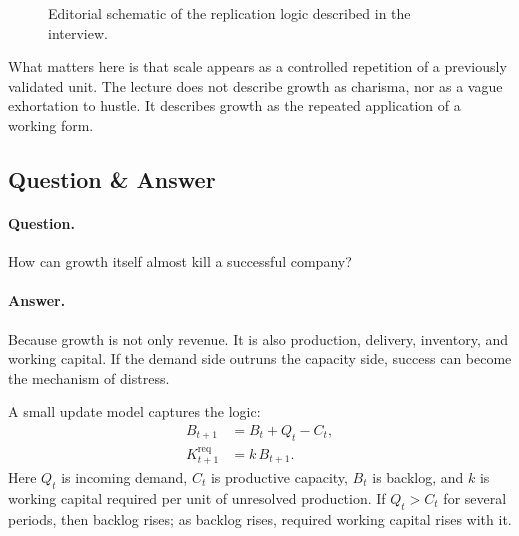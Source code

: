 \begin{figure}[h]
\centering
{}
\caption{Editorial schematic of the replication logic described in the interview.}
\end{figure}

What matters here is that scale appears as a controlled repetition of a previously validated unit. The lecture does not describe growth as charisma, nor as a vague exhortation to hustle. It describes growth as the repeated application of a working form.

\subsection{Question \& Answer}

\paragraph{Question.} How can growth itself almost kill a successful company?

\paragraph{Answer.} Because growth is not only revenue. It is also production, delivery, inventory, and working capital. If the demand side outruns the capacity side, success can become the mechanism of distress.

A small update model captures the logic:
\begin{align}
B_{t+1} &= B_t + Q_t - C_t,\\
K^{\mathrm{req}}_{t+1} &= k\,B_{t+1}.
\end{align}
Here $Q_t$ is incoming demand, $C_t$ is productive capacity, $B_t$ is backlog, and $k$ is working capital required per unit of unresolved production. If $Q_t > C_t$ for several periods, then backlog rises; as backlog rises, required working capital rises with it.


